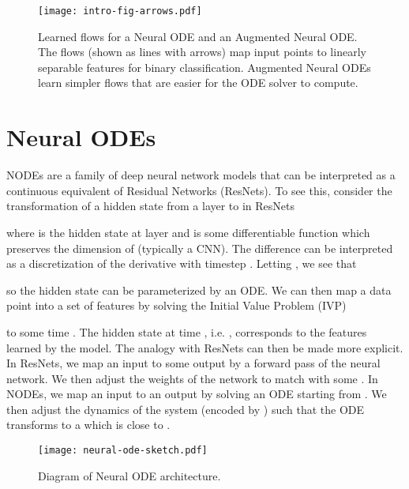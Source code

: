 \documentclass{article}
\begin{document}
\begin{figure}[h]
\begin{center}
\texttt{[image: intro-fig-arrows.pdf]}
\end{center}
\caption{Learned flows for a Neural ODE and an Augmented Neural ODE. The flows (shown as lines with arrows) map input points to linearly separable features for binary classification. Augmented Neural ODEs learn simpler flows that are easier for the ODE solver to compute.}
\label{node-vs-anode-flows}
\end{figure}

\section{Neural ODEs}\label{neural-ode-section}

NODEs are a family of deep neural network models that can be interpreted as a continuous equivalent of Residual Networks (ResNets). To see this, consider the transformation of a hidden state from a layer  to  in ResNets

where  is the hidden state at layer  and  is some differentiable function which preserves the dimension of  (typically a CNN). The difference  can be interpreted as a discretization of the derivative  with timestep . Letting , we see that

so the hidden state can be parameterized by an ODE. We can then map a data point  into a set of features  by solving the Initial Value Problem (IVP) 

to some time . The hidden state at time , i.e. , corresponds to the features learned by the model. The analogy with ResNets can then be made more explicit. In ResNets, we map an input  to some output  by a forward pass of the neural network. We then adjust the weights of the network to match  with some . In NODEs, we map an input  to an output  by solving an ODE starting from . We then adjust the dynamics of the system (encoded by ) such that the ODE transforms  to a  which is close to . 

\begin{wrapfigure}{r}{0.29\linewidth}
  \vspace{-20pt}
  \begin{center}
    \texttt{[image: neural-ode-sketch.pdf]}
  \end{center}
  \caption{Diagram of Neural ODE architecture.}
  \label{neural-ode-sketch}
  \vspace{-10pt}
\end{wrapfigure}
\end{document}
